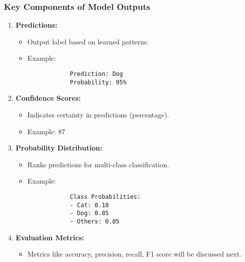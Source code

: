 \documentclass[aspectratio=169]{beamer}
\begin{document}
\begin{frame}[fragile]
    \frametitle{Key Components of Model Outputs}
    \begin{enumerate}
        \item \textbf{Predictions:}
        \begin{itemize}
            \item Output label based on learned patterns.
            \item Example: 
            \begin{lstlisting}
            Prediction: Dog
            Probability: 95%
            \end{lstlisting}
        \end{itemize}
        
        \item \textbf{Confidence Scores:}
        \begin{itemize}
            \item Indicates certainty in predictions (percentage).
            \item Example: 87%
        \end{itemize}
        
        \item \textbf{Probability Distribution:}
        \begin{itemize}
            \item Ranks predictions for multi-class classification.
            \item Example:
            \begin{lstlisting}
            Class Probabilities:
            - Cat: 0.10
            - Dog: 0.85
            - Others: 0.05
            \end{lstlisting}
        \end{itemize}
        
        \item \textbf{Evaluation Metrics:}
        \begin{itemize}
            \item Metrics like accuracy, precision, recall, F1 score will be discussed next.
        \end{itemize}
    \end{enumerate}
\end{frame}
\end{document}

